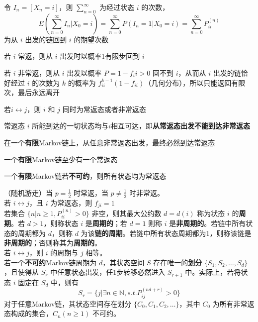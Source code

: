 \documentclass[./main.tex]{subfiles}
\begin{document}
\begin{enumerate*}
\item 令 $I_n=[X_n=i]$，则 $\sum_{n=0}^{\infty}$ 为经过状态 $i$ 的次数，$$E(\sum_{n=0}^{\infty}I_n|X_0=i)=\sum_{n=0}^{\infty}P(I_n=1|X_0=i)=\sum_{n=0}^{\infty}P_{ii}^{(n)}$$ 为从 $i$ 出发的链回到 $i$ 的期望次数
\item 若 $i$ 常返，则从 $i$ 出发时以概率1有限步回到 $i$
\item 若 $i$ 非常返，则从 $i$ 出发以概率 $P=1-f_ii>0$ 回不到 $i$，从而从 $i$ 出发的链恰好经过 $i$ 的次数为 $k$ 的概率为 $f_{ii}^{k-1}(1-f_{ii})$（几何分布），所以只能返回有限次，最后永远离开
\end{enumerate*}
\begin{enumerate*}
    \item 若$i\leftrightarrow j$，则 $i$ 和 $j$ 同时为常返态或者非常返态
    \item 常返态 $i$ 所能到达的一切状态均与$i$相互可达，即\textbf{从常返态出发不能到达非常返态}
    \item 在一个\textbf{有限}Markov链上，从任意非常返态出发，最终必然到达常返态
    \item 一个\textbf{有限}Markov链至少有一个常返态
    \item 一个\textbf{有限}Markov链若\textbf{不可约}，则所有状态均为常返态
\end{enumerate*}
（随机游走）当 $p=\frac{1}{2}$ 时常返，当 $p\neq\frac{1}{2}$ 时非常返。\\
若 $i\leftrightarrow j$，且 $i$ 为常返态，则 $f_{ji}=1$\\
若集合 $\{n|n\ge 1,P_{ii}^{(n)}>0\}$ 非空，则其最大公约数 $d=d(i)$ 称为状态 $i$ 的\textbf{周期}。若 $d>1$，则称状态 $i$ 是\textbf{周期的}；若 $d=1$ 则称 $i$ 是\textbf{非周期的}。若链中所有状态的周期都为 $d$，则称 $d$ 为该\textbf{链的周期}。若链中所有状态周期都为1，则称该链是\textbf{非周期的}；否则称其为\textbf{周期的}。\\
若 $i\leftrightarrow j$，则 $i$ 的周期与 $j$ 相等。\\
若一个\textbf{不可约}Markov链周期为 $d$，其状态空间 $S$ 存在唯一的\textbf{划分} $\{S_1,S_2,\dots,S_d\}$，且使得从 $S_r$ 中任意状态出发，任1步转移必然进入 $S_{r+1}$ 中。实际上，若将状态 $i$ 固定在 $S_d$ 中，则有$$S_r=\{j|\exists n\in\mathbb{N},s.t.P_{ij}^{(nd+r)}>0\}$$
\indent 对于任意Markov链，其状态空间存在划分 $\{C_0,C_1,C_2,\dots\}$，其中 $C_0$ 为所有非常返态构成的集合，$C_n(n\ge 1)$ 不可约。
\end{document}
